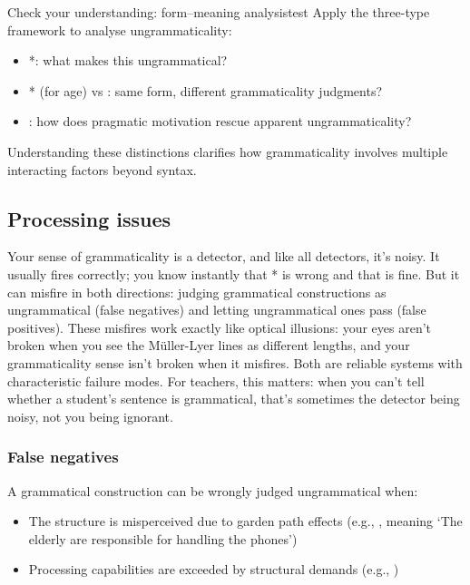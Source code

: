 \begin{tblsframedsymbol}{Check your understanding: form--meaning analysis}{test}
Apply the three-type framework to analyse ungrammaticality:
\begin{itemize}[noitemsep, leftmargin=*]
    \item *: what makes this ungrammatical?
    \item * (for age) vs : same form, different grammaticality judgments?
    \item {}: how does pragmatic motivation rescue apparent ungrammaticality?
\end{itemize}
Understanding these distinctions clarifies how grammaticality involves multiple interacting factors beyond syntax.
\end{tblsframedsymbol}

\subsection{Processing issues}

Your sense of grammaticality is a detector, and like all detectors, it's noisy. It usually fires correctly; you know instantly that * is wrong and that  is fine. But it can misfire in both directions: judging grammatical constructions as ungrammatical (false negatives) and letting ungrammatical ones pass (false positives). These misfires work exactly like optical illusions: your eyes aren't broken when you see the Müller-Lyer lines as different lengths, and your grammaticality sense isn't broken when it misfires. Both are reliable systems with characteristic failure modes. For teachers, this matters: when you can't tell whether a student's sentence is grammatical, that's sometimes the detector being noisy, not you being ignorant.

\subsubsection{False negatives}
A grammatical construction can be wrongly judged ungrammatical when:
\begin{itemize}[noitemsep]
    \item The structure is misperceived due to garden path effects (e.g., , meaning `The elderly are responsible for handling the phones')
    \item Processing capabilities are exceeded by structural demands (e.g., )
\end{itemize}

